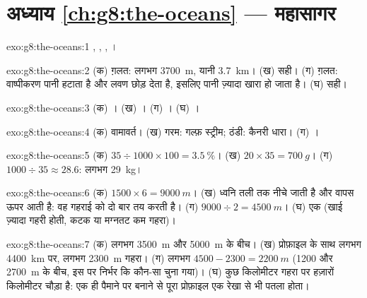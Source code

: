 \section*{अध्याय \ref{ch:g8:the-oceans} --- महासागर}

\begin{solution}{exo:g8:the-oceans:1}
, , , ।
\end{solution}

\begin{solution}{exo:g8:the-oceans:2}
(क) ग़लत: लगभग \qty{3700}{m}, यानी \qty{3.7}{km}। (ख) सही। (ग) ग़लत: वाष्पीकरण
पानी हटाता है और लवण छोड़ देता है, इसलिए पानी ज़्यादा खारा हो जाता है।
(घ) सही।
\end{solution}

\begin{solution}{exo:g8:the-oceans:3}
(क) । (ख) । (ग) । (घ) ।
\end{solution}

\begin{solution}{exo:g8:the-oceans:4}
(क) वामावर्त। (ख) गरम: गल्फ़ स्ट्रीम; ठंडी: कैनरी धारा। (ग) ।
\end{solution}

\begin{solution}{exo:g8:the-oceans:5}
(क) $35 \div 1000 \times 100 = 3.5~\%$। (ख) $20 \times 35 = \qty{700}{g}$।
(ग) $1000 \div 35 \approx 28.6$: लगभग \qty{29}{kg}।
\end{solution}

\begin{solution}{exo:g8:the-oceans:6}
(क) $1500 \times 6 = \qty{9000}{m}$। (ख) ध्वनि तली तक नीचे जाती है और वापस ऊपर आती
है: वह गहराई को दो बार तय करती है। (ग) $9000 \div 2 =
\qty{4500}{m}$। (घ) एक  (खाई ज़्यादा गहरी होती, कटक या मग्नतट कम
गहरा)।
\end{solution}

\begin{solution}{exo:g8:the-oceans:7}
(क) लगभग \qty{3500}{m} और \qty{5000}{m} के बीच। (ख) प्रोफ़ाइल के साथ लगभग
\qty{4400}{km} पर, लगभग \qty{2300}{m} गहरा। (ग) लगभग
$4500 - 2300 = \qty{2200}{m}$ (1200 और \qty{2700}{m} के बीच, इस पर निर्भर कि कौन-सा
 चुना गया)। (घ)  कुछ किलोमीटर गहरा पर हज़ारों किलोमीटर चौड़ा है: एक ही
पैमाने पर बनाने से पूरा प्रोफ़ाइल एक रेखा से भी पतला होता।
\end{solution}

